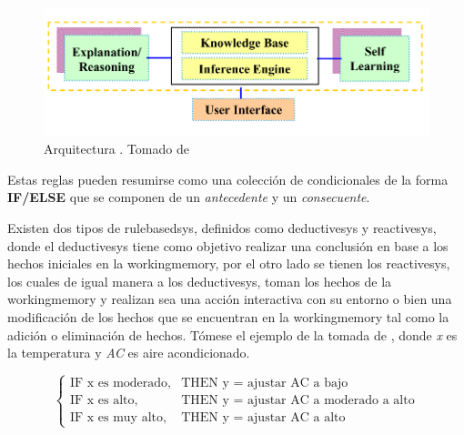 \begin{figure}[H]
\centering
\includegraphics[scale=0.4]{Figures/kbs-architecture.png}
\decoRule
\caption[Arquitectura ]{Arquitectura . Tomado de \cite{sajja2010knowledge} }
\label{fig:kbs-arch}
\end{figure}

Estas reglas pueden resumirse como una colección de condicionales de la forma \textbf{IF/ELSE} que se componen de un \emph{antecedente} y un \emph{consecuente}.

Existen dos tipos de \gls{rulebasedsys}, definidos como \gls{deductivesys} y \gls{reactivesys}, donde el \gls{deductivesys} tiene como objetivo realizar una conclusión en base a los hechos iniciales en la \gls{workingmemory}, por el otro lado se tienen los \gls{reactivesys}, los cuales de igual manera a los \gls{deductivesys}, toman los hechos de la \gls{workingmemory} y realizan sea una acción interactiva con su entorno o bien una modificación de los hechos que se encuentran en la \gls{workingmemory} tal como la adición o eliminación de hechos. Tómese el ejemplo de la  tomada de \cite{Mendel}, donde \emph{x} es la temperatura y \emph{AC} es aire acondicionado.

\begin{equation} \label{eq:rbs-example}
  \left\{ \begin{array}{ll}
            \text{IF x es moderado,} & \text{THEN y = ajustar AC a bajo} \\
            \text{IF x es alto,}     & \text{THEN y = ajustar AC a moderado a alto} \\
            \text{IF x es muy alto,} & \text{THEN y = ajustar AC a alto} 
          \end{array} \right.
\end{equation}

